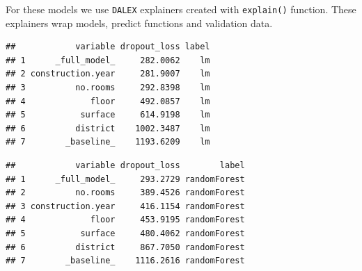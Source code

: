\documentclass[12pt,]{krantz}
\newenvironment{Shaded}{\begin{snugshade}}{\end{snugshade}}
\newcommand{\DataTypeTok}[1]{\textcolor[rgb]{0.13,0.29,0.53}{#1}}
\newcommand{\DecValTok}[1]{\textcolor[rgb]{0.00,0.00,0.81}{#1}}
\newcommand{\KeywordTok}[1]{\textcolor[rgb]{0.13,0.29,0.53}{\textbf{#1}}}
\newcommand{\NormalTok}[1]{#1}
\newcommand{\OperatorTok}[1]{\textcolor[rgb]{0.81,0.36,0.00}{\textbf{#1}}}
\newcommand{\StringTok}[1]{\textcolor[rgb]{0.31,0.60,0.02}{#1}}
\theoremstyle{definition}
\theoremstyle{definition}
\theoremstyle{definition}
\theoremstyle{remark}
\begin{document}
For these models we use \texttt{DALEX} explainers created with
\texttt{explain()} function. These explainers wrap models, predict
functions and validation data.

\begin{Shaded}
\end{Shaded}

\begin{verbatim}
##            variable dropout_loss label
## 1      _full_model_     282.0062    lm
## 2 construction.year     281.9007    lm
## 3          no.rooms     292.8398    lm
## 4             floor     492.0857    lm
## 5           surface     614.9198    lm
## 6          district    1002.3487    lm
## 7        _baseline_    1193.6209    lm
\end{verbatim}

\begin{Shaded}
\end{Shaded}

\begin{verbatim}
##            variable dropout_loss        label
## 1      _full_model_     293.2729 randomForest
## 2          no.rooms     389.4526 randomForest
## 3 construction.year     416.1154 randomForest
## 4             floor     453.9195 randomForest
## 5           surface     480.4062 randomForest
## 6          district     867.7050 randomForest
## 7        _baseline_    1116.2616 randomForest
\end{verbatim}
\end{document}
